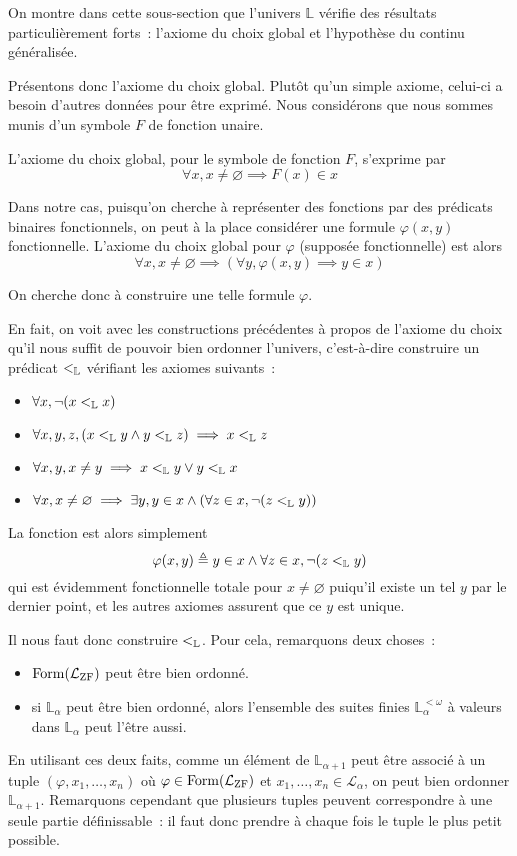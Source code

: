On montre dans cette sous-section que l'univers $\mathbb L$ vérifie des
résultats particulièrement forts~: l'axiome du choix global et l'hypothèse du
continu généralisée.

Présentons donc l'axiome du choix global. Plutôt qu'un simple axiome, celui-ci
a besoin d'autres données pour être exprimé. Nous considérons que nous sommes
munis d'un symbole $F$ de fonction unaire.

\begin{axiom}
  L'axiome du choix global, pour le symbole de fonction $F$, s'exprime par
  \[\forall x, x\neq \varnothing \implies F(x)\in x\]
\end{axiom}

Dans notre cas, puisqu'on cherche à représenter des fonctions par des prédicats
binaires fonctionnels, on peut à la place considérer une formule $\varphi(x,y)$
fonctionnelle. L'axiome du choix global pour $\varphi$ (supposée fonctionnelle)
est alors
\[\forall x, x \neq \varnothing \implies (\forall y, \varphi(x,y)\implies
y\in x)\]

On cherche donc à construire une telle formule $\varphi$.

En fait, on voit avec les constructions précédentes à propos de l'axiome du
choix qu'il nous suffit de pouvoir bien ordonner l'univers, c'est-à-dire
construire un prédicat $<_{\mathbb L}$ vérifiant les axiomes suivants~:
\begin{itemize}
\item $\forall x, \lnot(x <_{\mathbb L} x)$
\item $\forall x,y,z, (x <_{\mathbb L} y \land y <_{\mathbb L} z) \implies x <_{\mathbb L} z$
\item $\forall x,y, x\neq y \implies x <_{\mathbb L} y \lor y <_{\mathbb L} x$
\item $\forall x, x\neq \varnothing \implies
  \exists y, y \in x \land (\forall z \in x, \lnot (z <_{\mathbb L} y))$
\end{itemize}
La fonction est alors simplement
\[\varphi(x,y) \triangleq y \in x \land \forall z \in x, \lnot(z <_{\mathbb L} y)\]
qui est évidemment fonctionnelle totale pour $x\neq \varnothing$ puiqu'il existe
un tel $y$ par le dernier point, et les autres axiomes assurent que ce $y$ est
unique.

Il nous faut donc construire $<_{\mathbb L}$. Pour cela, remarquons deux choses~:
\begin{itemize}
\item $\operatorname{Form}(\mathcal L_{\operatorname{ZF}})$ peut être bien ordonné.
\item si $\mathbb L_\alpha$ peut être bien ordonné, alors l'ensemble des
  suites finies $\mathbb L_\alpha^{<\omega}$ à valeurs dans $\mathbb L_\alpha$
  peut l'être aussi.
\end{itemize}
En utilisant ces deux faits, comme un élément de $\mathbb L_{\alpha + 1}$
peut être associé à un tuple $(\varphi,x_1,\ldots,x_n)$ où
$\varphi\in\operatorname{Form}(\mathcal L_{\operatorname{ZF}})$ et $x_1,\ldots,x_n \in\mathcal L_{\alpha}$,
on peut bien ordonner $\mathbb L_{\alpha + 1}$. Remarquons cependant que
plusieurs tuples peuvent correspondre à une seule partie définissable~: il faut
donc prendre à chaque fois le tuple le plus petit possible.

